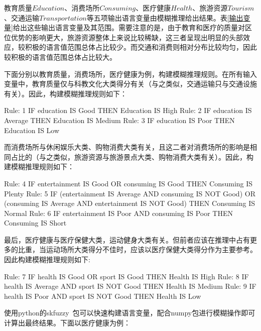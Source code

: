 \documentclass{article}
\begin{document}
教育质量$Education$、消费场所$Consuming$、医疗健康$Health$、旅游资源$Tourism$、交通运输$Transportation$等五项输出语言变量由模糊推理给出结果。表\ref{输出变量}给出这些输出语言变量及其范围。需要注意的是，由于教育和医疗的质量对区位优势的影响更大，旅游资源整体上来说比较稀缺，这三者呈现出明显的头部效应，较积极的语言值范围总体占比较少。而交通和消费则相对分布比较均匀，因此较积极的语言值范围总体占比较大。

下面分别以教育质量，消费场所，医疗健康为例，构建模糊推理规则。在所有输入变量中，教育质量仅与科教文化大类得分有关（与之类似，交通运输只与交通设施有关）。因此，构建模糊推理规则如下：

\begin{python}
Rule: 1
IF education IS Good
THEN Education IS High
Rule: 2
IF education IS Average
THEN Education IS Medium
Rule: 3
IF education IS Poor
THEN Education IS Low
\end{python}


而消费场所与休闲娱乐大类、购物消费大类有关，且这二者对消费场所的影响是相同占比的（与之类似，旅游资源与旅游景点大类、购物消费大类有关）。因此，构建模糊推理规则如下：

\begin{python}
Rule: 4
IF entertainment IS Good 
OR consuming IS Good
THEN Consuming IS Plenty
Rule: 5
IF (entertainment IS Average AND consuming IS NOT Good) 
OR (consuming IS Average AND entertainment IS NOT Good)
THEN Consuming IS Normal
Rule: 6
IF entertainment IS Poor
AND consuming IS Poor
THEN Consuming IS Short
\end{python}

最后，医疗健康与医疗保健大类，运动健身大类有关。但前者应该在推理中占有更多的比重，当运动场所大类得分不佳时，应该以医疗保健大类得分作为主要参考。因此构建模糊推理规则如下:

\begin{python}
Rule: 7
IF health IS Good
OR sport IS Good
THEN Health IS High
Rule: 8
IF health IS Average
AND sport IS NOT Good
THEN Health IS Medium
Rule: 9
IF health IS Poor
AND sport IS NOT Good
THEN Health IS Low
\end{python}

使用python的skfuzzy~\cite{skfuzzy}包可以快速构建语言变量，配合numpy包进行模糊操作即可计算出最终结果。下面以医疗健康为例：
\end{document}
